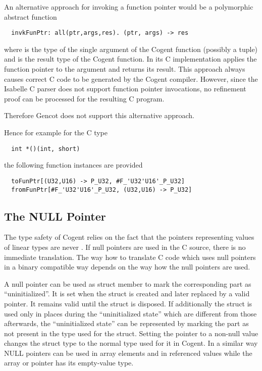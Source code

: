 An alternative approach for invoking a function pointer would be a polymorphic abstract function 
\begin{verbatim}
  invkFunPtr: all(ptr,args,res). (ptr, args) -> res
\end{verbatim}
where  is the type of the single argument of the Cogent function (possibly a tuple) and 
is the result type of the Cogent function. In its C implementation  applies the function pointer
to the argument and returns its result. 
This approach always causes correct C code to be generated by the Cogent compiler. However, since the Isabelle
C parser does not support function pointer invocations, no refinement proof can be processed for the resulting
C program.

Therefore Gencot does not support this alternative approach.

Hence for example for the C type
\begin{verbatim}
  int *()(int, short)
\end{verbatim}
the following function instances are provided
\begin{verbatim}
  toFunPtr[(U32,U16) -> P_U32, #F_'U32'U16'_P_U32]
  fromFunPtr[#F_'U32'U16'_P_U32, (U32,U16) -> P_U32]
\end{verbatim}


\subsection{The NULL Pointer}
\label{design-operations-null}

The type safety of Cogent relies on the fact that the pointers representing values of linear types are never .
If null pointers are used in the C source, there is no immediate translation. The way how to translate C code which uses 
null pointers in a binary compatible way depends on the way how the null pointers are used.

A null pointer can be used as struct member  to mark the corresponding part as ``uninitialized''. 
It is set when the struct is created and later
replaced by a valid pointer. It remains valid until the struct is disposed. If additionally the struct is used only in places
during the ``uninitialized state'' which are different from those afterwards, the ``uninitialized state'' can be represented
by marking the part  as not present in the type used for the struct. Setting the pointer to a non-null value 
changes the struct type to the normal type used for it in Cogent. In a similar way NULL pointers can be used in array
elements and in referenced values while the array or pointer has its empty-value type.

